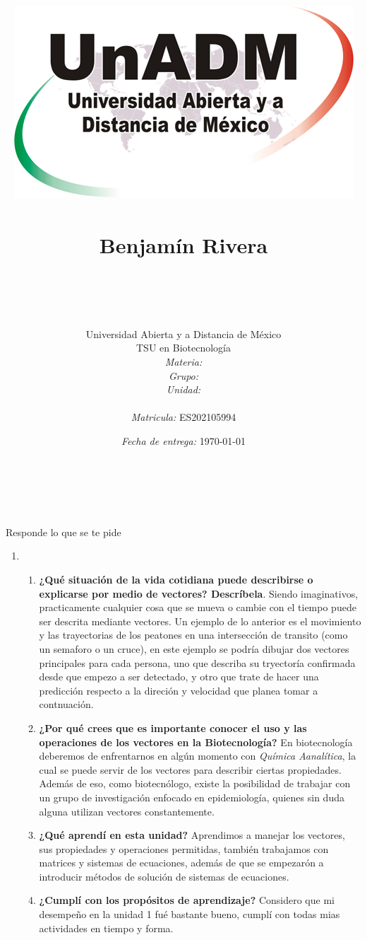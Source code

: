 \documentclass[12pt]{article}
\title{
	\includegraphics{../../../assets/logo-unadm} \\
	\ \\ Benjam\'in Rivera \\
	\bf{\titulo}\\\ \\}
\author{
	Universidad Abierta y a Distancia de México \\
	TSU en Biotecnolog\'ia \\
	\textit{Materia:} \materia \\
	\textit{Grupo:} \grupo \\
	\textit{Unidad:} \unidad \\
	\\
	\textit{Matricula:} ES202105994 }
\date{\textit{Fecha de entrega:} \today}
\begin{document}
\maketitle

\noindent\makebox[\linewidth]{\rule{\paperwidth}{0.4pt}}
	\ \\ \
	\par Responde lo que se te pide

\begin{enumerate}[\bf{Unidad} 1]
	\item \ \\
		\begin{enumerate}
			\item \textbf{¿Qué situación de la vida cotidiana puede describirse o explicarse por medio de vectores? Descríbela}. Siendo imaginativos, practicamente cualquier cosa que se mueva o cambie con el tiempo puede ser descrita mediante vectores. Un ejemplo de lo anterior es el movimiento y las trayectorias de los peatones en una intersección de transito (como un semaforo o un cruce), en este ejemplo se podría dibujar dos vectores principales para cada persona, uno que describa su tryectoría confirmada desde que empezo a ser detectado, y otro que trate de hacer una predicción respecto a la direción y velocidad que planea tomar a contnuación.
			
			\item \textbf{¿Por qué crees que es importante conocer el uso y las operaciones de los vectores en la Biotecnología?} En biotecnología deberemos de enfrentarnos en algún momento con \textit{Química Aanalítica}, la cual se puede servir de los vectores para describir ciertas propiedades. Además de eso, como biotecnólogo, existe la posibilidad de trabajar con un grupo de investigación enfocado en epidemiología, quienes sin duda alguna utilizan vectores constantemente.
			
			\item \textbf{¿Qué aprendí en esta unidad?} Aprendimos a manejar los vectores, sus propiedades y operaciones permitidas, también trabajamos con matrices y sistemas de ecuaciones, además de que se empezarón a introducir métodos de solución de sistemas de ecuaciones.
			
			\item \textbf{¿Cumplí con los propósitos de aprendizaje?} Considero que mi desempeño en la unidad 1 fué bastante bueno, cumplí con todas mias actividades en tiempo y forma.
		\end{enumerate}
	

\end{enumerate}
\end{document}
